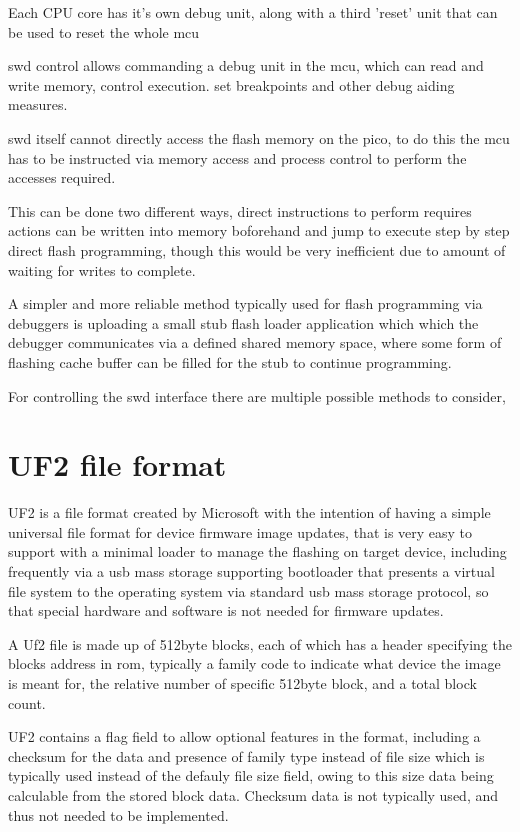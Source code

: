Each CPU core has it's own debug unit, along with a third 'reset' unit that can be used to reset the whole \gls{mcu}

\gls{swd}  control allows commanding a debug unit in the \gls{mcu}, which can read and write memory, control execution. set breakpoints and other debug aiding measures.

\gls{swd} itself cannot directly access the flash memory on the pico, to do this the \gls{mcu} has to be instructed via memory access and process control to perform the accesses required.

This can be done two different ways, direct instructions to perform requires actions can be written into memory
boforehand and jump to execute step by step direct flash programming, though this would be very inefficient due to amount of waiting for writes to complete.

A simpler and more reliable method typically used for flash programming via debuggers is uploading a small stub flash loader application which which the debugger communicates via a defined shared memory space, where some form of flashing cache buffer can be filled for the stub to continue programming.

For controlling the \gls{swd} interface there are multiple possible methods to consider,
\clearpage
\section{UF2 file format}
UF2 is a file format created by Microsoft with the intention of having a simple universal file format for device firmware image updates, that is very easy to support with a minimal loader to manage the flashing on target device, including frequently via a \gls{usb} mass storage supporting bootloader that presents a virtual file system to the operating system via standard \gls{usb} mass storage protocol, so that special hardware and software is not needed for firmware updates.

A Uf2 file is made up of 512byte blocks, each of which has a header specifying the blocks address in \gls{rom}, typically a family code to indicate what device the image is meant for, the relative number of specific 512byte block, and a total block count. 

UF2 contains a flag field to allow optional features in the format, including a checksum for the data and presence of family type instead of file size which is typically used instead of the defauly file size field, owing to this size data being calculable from the stored block data. Checksum data is not typically used, and thus not needed to be implemented.

